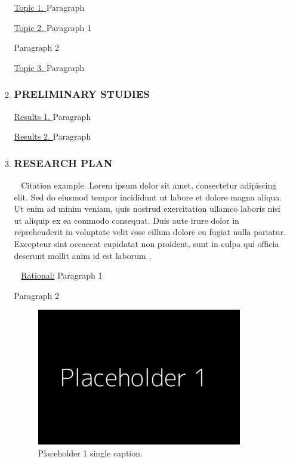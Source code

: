 \documentclass[11pt]{article}
\newcommand{\myparagraph}[1]{\vspace{0.5ex}\noindent{\bf #1} ~}
\begin{document}
\begin{enumerate}[wide, labelindent=0pt]
\begin{enumerate}[wide, labelindent=0pt]
        \underline{Topic 1. }
        Paragraph

        \underline{Topic 2. }
        Paragraph 1

        Paragraph 2

        \underline{Topic 3. } 
        Paragraph

    \item \subsubsection*{PRELIMINARY STUDIES}

        \underline{Results 1. } 
        Paragraph

        \underline{Results 2. }
        Paragraph

    \item \subsubsection*{RESEARCH PLAN}
        
        \myparagraph{Aim 1. }
        Citation example. Lorem ipsum dolor sit amet, consectetur adipiscing elit. Sed do eiusmod tempor incididunt ut labore et dolore magna aliqua. Ut enim ad minim veniam, quis nostrud exercitation ullamco laboris nisi ut aliquip ex ea commodo consequat. Duis aute irure dolor in reprehenderit in voluptate velit esse cillum dolore eu fugiat nulla pariatur. Excepteur sint occaecat cupidatat non proident, sunt in culpa qui officia deserunt mollit anim id est laborum \cite{Doe2024}. 

        \myparagraph{Aim 1.1 } 
        \underline{Rational:} 
        Paragraph 1

        Paragraph 2
        
        \begin{figure}[h]
            \centering 
            \includegraphics[width=0.9\textwidth]{images/Placeholder1.png}
            \caption{Placeholder 1 single caption.}
            \label{fig:placeholder_1_single}
        \end{figure}


\end{enumerate}
\end{enumerate}
\end{document}
